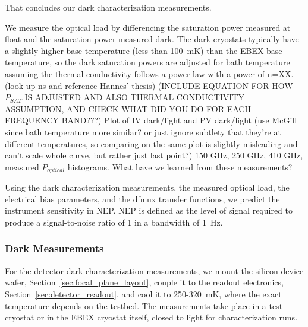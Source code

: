 That concludes our dark characterization measurements. 
 
We measure the optical load by differencing the saturation power measured at float and the saturation power measured dark. 
The dark cryostats typically have a slightly higher base temperature (less than 100~mK) than the \ac{EBEX} base temperature, so the dark saturation powers are adjusted for bath temperature assuming the thermal conductivity follows a power law with a power of n=XX. (look up ns and reference Hannes' thesis)
(INCLUDE EQUATION FOR HOW $P_{SAT}$ IS ADJUSTED AND ALSO THERMAL CONDUCTIVITY ASSUMPTION, AND CHECK WHAT DID YOU DO FOR EACH FREQUENCY BAND???)
Plot of IV dark/light and PV dark/light (use McGill since bath temperature more similar? or just ignore subtlety that they're at different temperatures, so comparing on the same plot is slightly misleading and can't scale whole curve, but rather just last point?)
150 GHz, 250 GHz, 410 GHz, measured $P_{optical}$ histograms.
What have we learned from these measurements?

Using the dark characterization measurements, the measured optical load, the electrical bias parameters, and the dfmux transfer functions, we predict the instrument sensitivity in \ac{NEP}. 
\ac{NEP} is defined as the level of signal required to produce a signal-to-noise ratio of 1 in a bandwidth of 1~Hz.  

\subsubsection{Dark Measurements}
\label{sec:dark_measurements}



For the detector dark characterization measurements, we mount the silicon device wafer, Section~\ref{sec:focal_plane_layout}, couple it to the readout electronics, Section~\ref{sec:detector_readout}, and cool it to 250-320~mK, where the exact temperature depends on the testbed. 
The measurements take place in a test cryostat or in the \ac{EBEX} cryostat itself, closed to light for characterization runs. %

